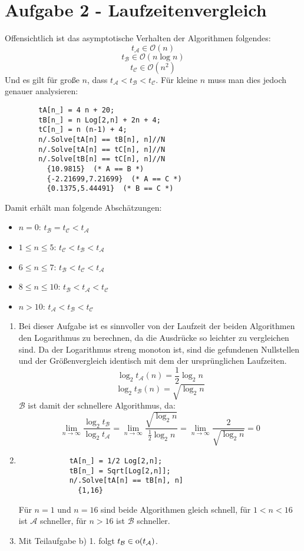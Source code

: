 \section*{Aufgabe 2 - Laufzeitenvergleich}
\begin{flushalpha}
\item
	Offensichtlich ist das asymptotische Verhalten der Algorithmen folgendes:
	\[ t_\mathcal{A} \in \mathcal{O}(n) \]
	\[ t_\mathcal{B} \in \mathcal{O}(n \log n) \]
	\[ t_\mathcal{C} \in \mathcal{O}(n^2) \]
	Und es gilt für große $n$, dass $t_\mathcal{A} < t_\mathcal{B} < t_\mathcal{C}$.
	Für kleine $n$ muss man dies jedoch genauer analysieren:
	\lstset{language=Mathematica}
	\begin{lstlisting}
		tA[n_] = 4 n + 20;
		tB[n_] = n Log[2,n] + 2n + 4;
		tC[n_] = n (n-1) + 4;
		n/.Solve[tA[n] == tB[n], n]//N
		n/.Solve[tA[n] == tC[n], n]//N
		n/.Solve[tB[n] == tC[n], n]//N
		  {10.9815}  (* A == B *)
		  {-2.21699,7.21699}  (* A == C *)
		  {0.1375,5.44491}  (* B == C *)
	\end{lstlisting}
	Damit erhält man folgende Abschätzungen:
	\begin{itemize}
		\item $n=0$: $t_\mathcal{B} = t_\mathcal{C} < t_\mathcal{A}$
		\item $1 \leq n \leq 5$: $t_\mathcal{C} < t_\mathcal{B} < t_\mathcal{A}$
		\item $6 \leq n \leq 7$: $t_\mathcal{B} < t_\mathcal{C} < t_\mathcal{A}$
		\item $8 \leq n \leq 10$: $t_\mathcal{B} < t_\mathcal{A} < t_\mathcal{C}$
		\item $n > 10$: $t_\mathcal{A} < t_\mathcal{B} < t_\mathcal{C}$
	\end{itemize}

\item 
	\begin{enumerate}[1.]
	\item
		Bei dieser Aufgabe ist es sinnvoller von der Laufzeit der beiden Algorithmen den Logarithmus zu berechnen,
		da die Ausdrücke so leichter zu vergleichen sind. Da der Logarithmus streng monoton ist,
		sind die gefundenen Nullstellen und der Größenvergleich identisch mit dem der ursprünglichen Laufzeiten.
		\[ \log_2 t_\mathcal{A}(n) = \frac{1}{2} \log_2 n \]
		\[ \log_2 t_\mathcal{B}(n) = \sqrt{\log_2 n} \]
		$\mathcal{B}$ ist damit der schnellere Algorithmus, da:
		\[ \lim_{n \rightarrow \infty} \frac{\log_2 t_\mathcal{B}}{\log_2 t_\mathcal{A}} = 
		   \lim_{n \rightarrow \infty} \frac{\sqrt{\log_2 n}}{\frac{1}{2} \log_2 n} =
		   \lim_{n \rightarrow \infty} \frac{2}{\sqrt{\log_2 n}} = 0 \]
	\item
		\begin{lstlisting}
			tA[n_] = 1/2 Log[2,n];
			tB[n_] = Sqrt[Log[2,n]];
			n/.Solve[tA[n] == tB[n], n]
			  {1,16}
		\end{lstlisting}
		Für $n=1$ und $n=16$ sind beide Algorithmen gleich schnell, für $1 < n < 16$ ist $\mathcal{A}$ schneller,
		für $n > 16$ ist $\mathcal{B}$ schneller.
	
	\item
		Mit Teilaufgabe b) 1. folgt $t_\mathcal{B} \in \hbox{o}(t_\mathcal{A})$.
	\end{enumerate}
\end{flushalpha}
